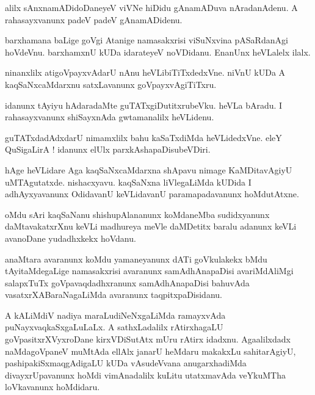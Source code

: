 \documentclass{article}
\begin{document}
\begin{mn}%
alilx sAnxnamADidoDaneyeV viVNe hiDidu gAnamADuva nAradanAdenu. A rahasayxvanunx padeV 
padeV gAnamADidenu.
\end{mn}

\begin{mn}%
barxhamana baLige goVgi Atanige namasakxrisi viSuNxvina pASaRdanAgi hoVdeVnu. barxhamxnU 
kUDa idarateyeV noVDidanu. EnanUnx heVLalelx ilalx.
\end{mn}

\begin{mn}%
ninanxlilx atigoVpayxvAdarU nAnu heVLibiTiTxdedxVne. niVnU kUDa A kaqSaNxcaMdarxnu 
satxLavanunx goVpayxvAgiTiTxru.
\end{mn}

\begin{mn}%
idanunx tAyiyu hAdaradaMte guTATxgiDutitxrubeVku. heVLa bAradu. I rahasayxvanunx 
shiSayxnAda gwtamanalilx heVLidenu.
\end{mn}

\begin{mn}%
guTATxdadAdxdarU nimamxlilx bahu kaSaTxdiMda heVLidedxVne. eleY QuSigaLirA ! idanunx elUlx 
parxkAshapaDisubeVDiri.
\end{mn}

\begin{mn}%
hAge heVLidare Aga kaqSaNxcaMdarxna shApavu nimage KaMDitavAgiyU uMTAgutatxde. 
nishacxyavu. kaqSaNxna liVlegaLiMda kUDida I adhAyxyavanunx OdidavanU keVLidavanU 
paramapadavanunx hoMdutAtxne.
\end{mn}



\begin{mn}%
oMdu sAri kaqSaNanu shishupAlananunx koMdaneMba sudidxyanunx daMtavakatxrXnu keVLi 
madhureya meVle daMDetitx baralu adanunx keVLi avanoDane yudadhxkekx hoVdanu.
\end{mn}

\begin{mn}%
anaMtara avaranunx koMdu yamaneyanunx dATi goVkulakekx  bMdu tAyitaMdegaLige namasakxrisi 
avaranunx samAdhAnapaDisi avariMdAliMgi salapxTuTx goVpavaqdadhxranunx samAdhAnapaDisi 
bahuvAda vasatxrXABaraNagaLiMda avaranunx taqpitxpaDisidanu.
\end{mn}

\begin{mn}%
A kALiMdiV nadiya maraLudiNeNxgaLiMda ramayxvAda puNayxvaqkaSxgaLuLaLx. A sathxLadalilx 
rAtirxhagaLU goVpasitxrXVyxroDane kirxVDiSutAtx mUru rAtirx idadxnu. Agaalilxdadx 
naMdagoVpaneV muMtAda ellAlx janarU heMdaru makakxLu sahitarAgiyU, pashipakiSxmaqgAdigaLU 
kUDa vAsudeVvana anugarxhadiMda divayxrUpavanunx hoMdi vimAnadalilx kuLitu utatxmavAda 
veYkuMTha loVkavanunx hoMdidaru.
\end{mn}
\end{document}
